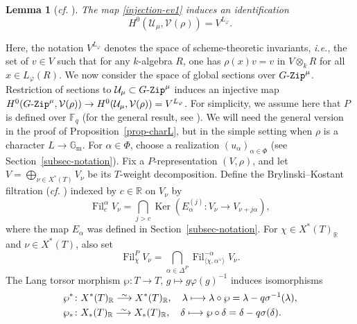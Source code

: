 \documentclass[10pt,a4paper]{article}
\numberwithin{equation}{section}
\newtheorem{lemma}[theorem]{Lemma}
\theoremstyle{definition}
\theoremstyle{remark}
\newcommand{\GZip}{\mathop{\text{$G$-{\tt Zip}}}\nolimits}
\newcommand{\Ucal}{{\mathcal U}}
\newcommand{\Vcal}{{\mathcal V}}
\newcommand{\FF}{\mathbb{F}}
\newcommand{\GG}{\mathbb{G}}
\newcommand{\RR}{\mathbb{R}}
\DeclareMathOperator{\Ker}{Ker}
\newcommand{\cf}{{\em cf. }}
\DeclareMathOperator{\fil}{Fil}
\def\lowsim{\vbox to 0pt{\vss\hbox{$\scriptstyle\sim$}\vskip-1.6pt}}
\begin{document}
\begin{lemma}[\textit{cf.} {\cite[Corollary 3.2.3]{Imai-Koskivirta-vector-bundles}}] \label{lem-Umu-sections}
The map \eqref{injection-ev1} induces an identification
\begin{equation}
 H^0\left(\Ucal_\mu,\Vcal(\rho)\right)=V^{L_\varphi}.   
\end{equation}
\end{lemma}

Here, the notation $V^{L_{\varphi}}$ denotes the space of scheme-theoretic invariants, \textit{i.e.}, the set of $v\in V$ such that for any $k$-algebra $R$, one has $\rho(x)v=v$ in $V\otimes_k R$ for all $x\in L_{\varphi}(R)$. We now consider the space of global sections over $\GZip^\mu$. Restriction of sections to $\Ucal_\mu\subset \GZip^\mu$ induces an injective map $H^0(\GZip^{\mu},\Vcal(\rho))\to H^0(\Ucal_\mu,\Vcal(\rho))=V^{L_\varphi}$. For simplicity, we assume here that $P$ is defined over $\FF_q$ (for the general result, see \cite[Theorem 3.4.1]{Imai-Koskivirta-vector-bundles}). We will need the general version in the proof of Proposition~\ref{prop-charL}, but in the simple setting when $\rho$ is a character $L\to \GG_{\mathrm{m}}$. For $\alpha\in \Phi$, choose a realization $(u_{\alpha})_{\alpha \in \Phi}$ (see Section~\ref{subsec-notation}). Fix a $P$-representation $(V,\rho)$, and let $V=\bigoplus_{\nu \in X^*(T)} V_\nu$ be its $T$-weight decomposition. Define the Brylinski--Kostant filtration (\cf \cite[Equation~(3.3.2)]{Xiao-Zhu-on-vector-valued}) indexed by $c\in \RR$ on $V_\nu$ by 
\begin{equation}\label{equ-Filc}
\fil_{c}^{\alpha} V_{\nu} = 
 \bigcap_{j > c} \Ker \left( 
 E_{\alpha}^{(j)} \colon V_{\nu} \to V_{\nu+j\alpha} \right), 
\end{equation}
where the map $E_{\alpha}$ was defined in Section~\ref{subsec-notation}. For $\chi \in X^*(T)_{\RR}$ and $\nu \in X^*(T)$, also set
\begin{equation}\label{equ-FilPchi}
 \fil_{\chi}^P 
 V_{\nu} = 
 \bigcap_{\alpha \in \Delta^P} 
 \fil_{\langle \chi, \alpha^\vee \rangle}^{-\alpha} 
 V_{\nu}.
\end{equation}
The Lang torsor morphism $\wp \colon T \to T$, $g\mapsto g\varphi(g)^{-1}$ induces isomorphisms 
\begin{align}
 &\wp^* \colon X^*(T)_{\RR} \stackrel{\lowsim}{\longrightarrow} X^*(T)_{\RR},\quad \lambda \longmapsto \lambda \circ \wp  = \lambda -q\sigma^{-1}(\lambda), \label{equ-Pupstar} \\
 &\wp_* \colon X_*(T)_{\RR} \stackrel{\lowsim}{\longrightarrow} X_*(T)_{\RR},\quad \delta \longmapsto \wp \circ \delta  = \delta -q\sigma(\delta).  \label{equ-Plowstar}
\end{align}
\end{document}
